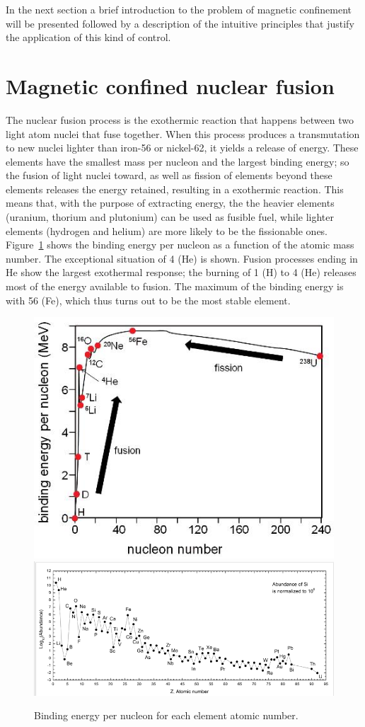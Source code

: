 In the next section a brief introduction to the problem of magnetic confinement will be presented followed by a description of the intuitive principles that justify the application of this kind of control.




\section{Magnetic confined nuclear fusion}
The nuclear fusion process is the exothermic reaction that happens between two light atom nuclei that fuse together. When this process produces a transmutation to new nuclei lighter than iron-56 or nickel-62, it yields a release of energy. These elements have the smallest mass per nucleon and the largest binding energy; so the fusion of light nuclei toward, as well as fission of elements beyond these elements releases the energy retained, resulting in a exothermic reaction.  This means that, with the purpose of extracting energy, the the heavier elements (uranium, thorium and plutonium) can be used as fusible fuel, while lighter elements (hydrogen and helium) are more likely to be the fissionable ones. 
Figure~\ref{fig:binding} shows the binding energy per nucleon as a function of the atomic mass number. The exceptional situation of 4 (He) is shown. Fusion processes ending in He show the largest exothermal response; the burning of 1 (H) to 4 (He) releases most of the energy available to fusion. The maximum of the binding energy is with 56 (Fe), which thus turns out to be the most stable element.
\begin{figure}[ht!]
\includegraphics[height=0.25\textwidth]{img/binding_energy.jpg} \centering
\includegraphics[height=0.25\textwidth]{img/abundance.png} \centering
\caption{Binding energy per nucleon for each element atomic number. }
\label{fig:binding}
\end{figure}

